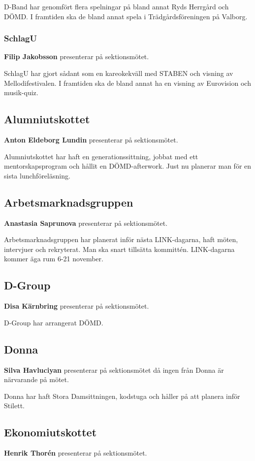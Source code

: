 \documentclass[../protokoll-vintermote-2024.tex]{subfiles}
\begin{document}
D-Band har genomfört flera spelningar på bland annat Ryds Herrgård och DÖMD. I framtiden ska de bland annat spela i Trädgårdsföreningen på Valborg.

\subsubsection{SchlagU}
\textbf{Filip Jakobsson} presenterar på sektionsmötet. 

SchlagU har gjort sådant som en kareokekväll med STABEN och visning av Mellodifestivalen. I framtiden ska de bland annat ha en visning av Eurovision och musik-quiz.

\subsection{Alumniutskottet}
\textbf{Anton Eldeborg Lundin} presenterar på sektionsmötet. 

Alumniutskottet har haft en generationssittning, jobbat med ett mentorskapsprogram och hållit en DÖMD-afterwork. Just nu planerar man för en sista lunchföreläsning.

\subsection{Arbetsmarknadsgruppen}
\textbf{Anastasia Saprunova} presenterar på sektionsmötet. 

Arbetsmarknadsgruppen har planerat inför nästa LINK-dagarna, haft möten, intervjuer och rekryterat. Man ska snart tillsätta kommittén. LINK-dagarna kommer äga rum 6-21 november.

\pagebreak

\subsection{D-Group}
\textbf{Disa Kärnbring} presenterar på sektionsmötet.

D-Group har arrangerat DÖMD.

\subsection{Donna}
\textbf{Silva Havluciyan} presenterar på sektionsmötet då ingen från Donna är närvarande på mötet.

Donna har haft Stora Damsittningen, kodstuga och håller på att planera inför Stilett.

\subsection{Ekonomiutskottet}
\textbf{Henrik Thorén} presenterar på sektionsmötet.
\end{document}
